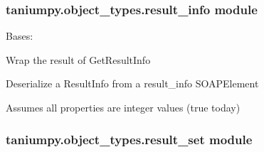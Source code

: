 \documentclass[letterpaper,10pt,english]{sphinxmanual}
\begin{document}
\subsubsection{taniumpy.object\_types.result\_info module}
\label{taniumpy.object_types:module-taniumpy.object_types.result_info}\label{taniumpy.object_types:taniumpy-object-types-result-info-module}

\begin{fulllineitems}
\label{taniumpy.object_types:taniumpy.object_types.result_info.ResultInfo}
Bases: \href{http://docs.python.org/2.7/library/functions.html\#object}{}

Wrap the result of GetResultInfo

\begin{fulllineitems}
\label{taniumpy.object_types:taniumpy.object_types.result_info.ResultInfo.fromSOAPElement}
Deserialize a ResultInfo from a result\_info SOAPElement

Assumes all properties are integer values (true today)

\end{fulllineitems}


\end{fulllineitems}



\subsubsection{taniumpy.object\_types.result\_set module}
\label{taniumpy.object_types:module-taniumpy.object_types.result_set}\label{taniumpy.object_types:taniumpy-object-types-result-set-module}
\end{document}
